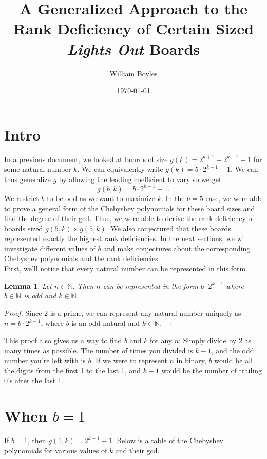 \documentclass{article}
\newtheorem{lemma}{Lemma}
\newcommand{\N}{\mathbb{N}}
\begin{document}
	\title{A Generalized Approach to the Rank Deficiency of Certain Sized \textit{Lights Out} Boards}
	\author{William Boyles}
	\date{\today}
	\maketitle
	
	\section{Intro}
	In a previous document, we looked at boards of size $g(k) = 2^{k+1} + 2^{k-1} - 1$ for some natural number $k$.
	We can equivalently write $g(k) = 5\cdot2^{k-1} - 1$.
	We can thus generalize $g$ by allowing the leading coefficient to vary so we get
	\begin{equation*}
		g(b,k) = b\cdot2^{k-1} - 1.
	\end{equation*}
	We restrict $b$ to be odd as we want to maximize $k$.
	In the $b=5$ case, we were able to prove a general form of the Chebyshev polynomials for these board sizes and find the degree of their gcd.
	Thus, we were able to derive the rank deficiency of boards sized $g(5,k) \times g(5,k)$.
	We also conjectured that these boards represented exactly the highest rank deficiencies.
	In the next sections, we will investigate different values of $b$ and make conjectures about the corresponding Chebyshev polynomials and the rank deficiencies. \\
	
	First, we'll notice that every natural number can be represented in this form.
	\begin{lemma}
		Let $n \in \N$.
		Then $n$ can be represented in the form $b\cdot2^{k-1}$ where $b \in \N$ is odd and $k \in \N$.
	\end{lemma}
	\begin{proof}
		Since 2 is a prime, we can represent any natural number uniquely as $n = b\cdot2^{k-1}$, where $b$ is an odd natural and $k \in \N$.
	\end{proof}
	This proof also gives us a way to find $b$ and $k$ for any $n$: Simply divide by 2 as many times as possible. The number of times you divided is $k-1$, and the odd number you're left with is $b$.
	If we were to represent $n$ in binary, $b$ would be all the digits from the first 1 to the last 1, and $k-1$ would be the number of trailing 0's after the last 1.
	
	\newpage
	\section{When $b = 1$}
	If $b=1$, then $g(1,k) = 2^{k-1} - 1$.
	Below is a table of the Chebyshev polynomials for various values of $k$ and their gcd.
	
\end{document}
